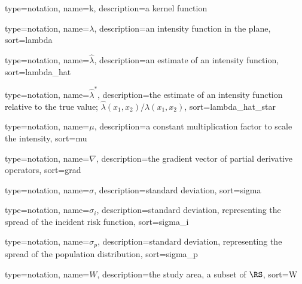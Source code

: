 


{%
   type=notation,
   name={k},
   description={a kernel function}
}

{%
   type=notation,
   name={\ensuremath{\lambda}},
   description={an intensity function in the plane},
   sort={lambda}
}

{%
   type=notation,
   name={\ensuremath{\hat{\lambda}}},
   description={an estimate of an intensity function},
   sort={lambda_hat}
}

{%
   type=notation,
   name={\ensuremath{\hat{\lambda}^*}},
   description={the estimate of an intensity function relative to the true value; \ensuremath{\hat{\lambda}(x_1, x_2)/\lambda(x_1, x_2)}},
   sort={lambda_hat_star}
}

{%
   type=notation,
   name={\ensuremath{\mu}},
   description={a constant multiplication factor to scale the intensity},
   sort={mu}
}

{%
   type=notation,
   name={\ensuremath{\nabla}},
   description={the gradient vector of partial derivative operators},
   sort={grad}
}

{%
   type=notation,
   name={\ensuremath{\sigma}},
   description={standard deviation},
   sort={sigma}
}

{%
   type=notation,
   name={\ensuremath{\sigma_i}},
   description={standard deviation, representing the spread of the incident risk function},
   sort={sigma_i}
}

{%
   type=notation,
   name={\ensuremath{\sigma_p}},
   description={standard deviation, representing the spread of the population distribution},
   sort={sigma_p}
}

{%
   type=notation,
   name={\ensuremath{W}},
   description={the study area, a subset of \ensuremath{\RS}},
   sort={W}
}



